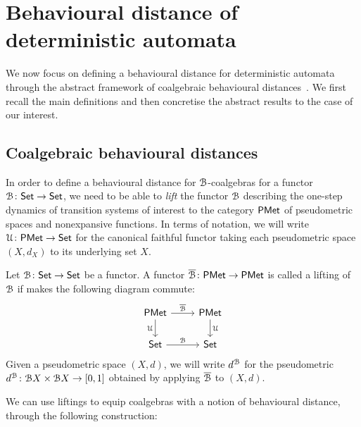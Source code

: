\section{Behavioural distance of deterministic automata}\label{c2:sec:behavioural_distance}
We now focus on defining a behavioural distance for deterministic automata through the abstract framework of coalgebraic behavioural distances~\cite{Baldan:2018:Coalgebraic}. We first recall the main definitions and then concretise the abstract results to the case of our interest.
\subsection{Coalgebraic behavioural distances}\label{c2:subsec:coalgebraic_behavioural_distances}
In order to define a behavioural distance for $\mathcal{B}$-coalgebras for a functor $\mathcal{B} \colon {\mathsf{Set}} \to {\mathsf{Set}}$, we need to be able to \emph{lift} the functor $\mathcal{B}$ describing the one-step dynamics of transition systems of interest to the category $\mathsf{PMet}$ of pseudometric spaces and nonexpansive functions. In terms of notation, we will write $\mathcal{U} \colon \mathsf{PMet} \to {\mathsf{Set}}$ for the canonical faithful functor taking each pseudometric space $(X, d_X)$ to its underlying set $X$.
\begin{definition}\label{c2:def:lifting}
	Let $\mathcal{B} \colon {\mathsf{Set}} \to {\mathsf{Set}}$ be a functor. A functor $\overline{\mathcal{B}} \colon \mathsf{PMet} \to \mathsf{PMet}$ is called a lifting of $\mathcal{B}$ if makes the following diagram commute:
\[\begin{tikzcd}
	\PMet & \PMet \\
	\Set & \Set
	\arrow["{\overline{\funB}}", from=1-1, to=1-2]
	\arrow["\forget"', from=1-1, to=2-1]
	\arrow["\forget", from=1-2, to=2-2]
	\arrow["\funB", from=2-1, to=2-2]
\end{tikzcd}\]
Given a pseudometric space $(X, d)$, we will write $d^{\mathcal{B}}$ for the pseudometric $d^{\funB} \colon \funB X \times \funB X \to \interval{0}{1}$ obtained by applying $\overline{\mathcal{B}}$ to $(X,d)$.
\end{definition}
We can use liftings to equip coalgebras with a notion of behavioural distance, through the following construction:
